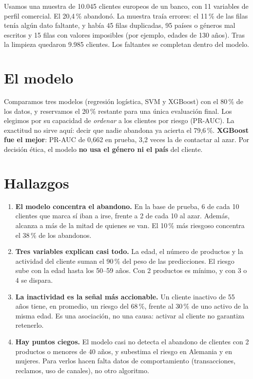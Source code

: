 \documentclass[11pt,a4paper]{article}
\begin{document}
Usamos una muestra de 10.045 clientes europeos de un banco, con 11 variables de perfil comercial. El 20,4\,\%
abandonó. La muestra traía errores: el 11\,\% de las filas tenía algún dato faltante, y había 45 filas duplicadas, 95
países o géneros mal escritos y 15 filas con valores imposibles (por ejemplo, edades de 130 años). Tras la limpieza
quedaron 9.985 clientes. Los faltantes se completan dentro del modelo.

\section{El modelo}

Comparamos tres modelos (regresión logística, SVM y XGBoost) con el 80\,\% de los datos, y reservamos el 20\,\%
restante para una única evaluación final. Los elegimos por su capacidad de \emph{ordenar} a los clientes por riesgo
(PR-AUC). La exactitud no sirve aquí: decir que nadie abandona ya acierta el 79,6\,\%. \textbf{XGBoost fue el mejor}:
PR-AUC de 0,662 en prueba, 3,2 veces la de contactar al azar. Por decisión ética, el modelo \textbf{no usa el género
ni el país} del cliente.

\section{Hallazgos}

\begin{enumerate}
  \item \textbf{El modelo concentra el abandono.} En la base de prueba, 6 de cada 10 clientes que marca sí iban a
    irse, frente a 2 de cada 10 al azar. Además, alcanza a más de la mitad de quienes se van. El 10\,\% más
    riesgoso concentra el 38\,\% de los abandonos.
  \item \textbf{Tres variables explican casi todo.} La edad, el número de productos y la actividad del cliente
    suman el 90\,\% del peso de las predicciones. El riesgo sube con la edad hasta los 50--59 años. Con 2 productos
    es mínimo, y con 3 o 4 se dispara.
  \item \textbf{La inactividad es la señal más accionable.} Un cliente inactivo de 55 años tiene, en promedio, un
    riesgo del 68\,\%, frente al 30\,\% de uno activo de la misma edad. Es una asociación, no una causa: activar al
    cliente no garantiza retenerlo.
  \item \textbf{Hay puntos ciegos.} El modelo casi no detecta el abandono de clientes con 2 productos o menores de 40
    años, y subestima el riesgo en Alemania y en mujeres. Para verlos hacen falta datos de comportamiento
    (transacciones, reclamos, uso de canales), no otro algoritmo.
\end{enumerate}
\end{document}

